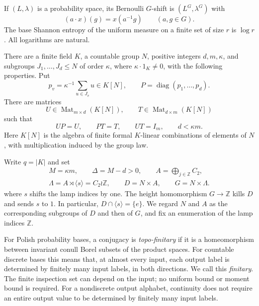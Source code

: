 \documentclass[11pt,a4paper]{article}
\numberwithin{equation}{section}
\DeclareMathOperator{\Mat}{Mat}
\DeclareMathOperator{\diag}{diag}
\newcommand{\ZZ}{\mathbb Z}
\begin{document}
If $(L,\lambda)$ is a probability space, its Bernoulli $G$-shift is
$(L^G,\lambda^G)$ with
\[
 (a\cdot x)(g)=x(a^{-1}g)\qquad(a,g\in G).
\]
The base Shannon entropy of the uniform measure on a finite set of size
$r$ is $\log r$. All logarithms are natural.

\begin{hypothesis}\label{hyp:algebra}
There are a finite field $K$, a countable group $N$, positive integers
$d,m,\kappa$, and subgroups $J_1,\ldots,J_d\leq N$ of order $\kappa$,
where $\kappa\cdot1_K\ne0$, with the following properties. Put
\[
 p_v=\kappa^{-1}\sum_{u\in J_v}u\in K[N],
 \qquad P=\diag(p_1,\ldots,p_d).
\]
There are matrices
\[
 U\in\Mat_{m\times d}(K[N]),\qquad
 T\in\Mat_{d\times m}(K[N])
\]
such that
\begin{equation}\label{eq:input}
 UP=U,\qquad PT=T,\qquad UT=I_m,\qquad d<\kappa m.
\end{equation}
Here $K[N]$ is the algebra of finite formal $K$-linear combinations of
elements of $N$, with multiplication induced by the group law.
\end{hypothesis}

Write $q=|K|$ and set
\begin{equation}\label{eq:parameters}
\begin{gathered}
 M=\kappa m,\qquad \Delta=M-d>0,
 \qquad A=\bigoplus_{j\in\ZZ}C_2,\\
 \Lambda=A\rtimes\langle s\rangle=C_2\wr\ZZ,\qquad
 D=N\times A,\qquad G=N\times\Lambda.
\end{gathered}
\end{equation}
where $s$ shifts the lamp indices by one. The height homomorphism
$G\to\ZZ$ kills $D$ and sends $s$ to $1$. In particular,
$D\cap\langle s\rangle=\{e\}$.
We regard $N$ and $A$ as the corresponding subgroups of $D$ and then of $G$,
and fix an enumeration of the lamp indices $\ZZ$.

\begin{definition}\label{def:finitary}
For Polish probability bases, a conjugacy is \emph{topo-finitary} if it
is a homeomorphism between invariant conull Borel subsets of the product
spaces. For countable discrete bases this means that, at almost every
input, each output label is determined by finitely many input labels,
in both directions. We call this \emph{finitary}. The finite inspection
set can depend on the input; no uniform bound or moment bound is required.
For a nondiscrete output alphabet, continuity does not require an entire
output value to be determined by finitely many input labels.
\end{definition}
\end{document}
